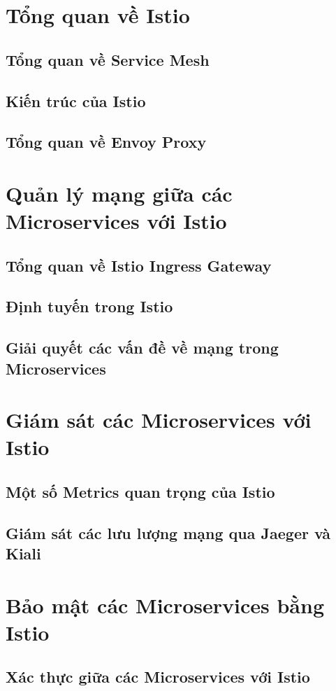\documentclass[12pt,a4paper]{report}
\begin{document}
		\section{Tổng quan về Istio}
			\subsection{Tổng quan về Service Mesh}
			\subsection{Kiến trúc của Istio}
		\subsection{Tổng quan về Envoy Proxy}
		\section{Quản lý mạng giữa các Microservices với Istio}
			\subsection{Tổng quan về Istio Ingress Gateway}
			\subsection{Định tuyến trong Istio}
			\subsection{Giải quyết các vấn đề về mạng trong Microservices}
		\section{Giám sát các Microservices với Istio}
			\subsection{Một số Metrics quan trọng của Istio}
			\subsection{Giám sát các lưu lượng mạng qua Jaeger và Kiali}
		\section{Bảo mật các Microservices bằng Istio}
			\subsection{Xác thực giữa các Microservices với Istio}
\end{document}
